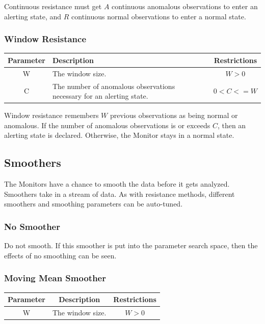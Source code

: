 \documentclass[12pt]{ucthesis}
\begin{document}
Continuous resistance must get $A$ continuous anomalous observations to enter an alerting state, and $R$ continuous normal
observations to enter a normal state.

\subsubsection{Window Resistance}
\begin{table}[H]
   \begin{center}
      \begin{tabular}{|c|p{9cm}|c|}
         \hline
            Parameter & Description & Restrictions \\
         \hline
            W & The window size. & $ W > 0 $ \\
         \hline
            C & The number of anomalous observations necessary for an alerting state. & $ 0 < C <= W $ \\
         \hline
      \end{tabular}
   \end{center}
\end{table}

Window resistance remembers $W$  previous observations as being normal or anomalous. If the number of anomalous
observations is or exceeds $C$, then an alerting state is declared. Otherwise, the Monitor stays in a normal state.

\subsection{Smoothers}
\label{arch-smoothers}
The Monitors have a chance to smooth the data before it gets analyzed.
Smoothers take in a stream of data.
As with resistance methods, different smoothers and smoothing parameters can be auto-tuned.

\subsubsection{No Smoother}
Do not smooth. If this smoother is put into the parameter search space, then the effects of no smoothing can be seen.

\subsubsection{Moving Mean Smoother}
\begin{table}[H]
   \begin{center}
      \begin{tabular}{|c|c|c|}
         \hline
            Parameter & Description & Restrictions \\
         \hline
            W & The window size. & $ W > 0 $ \\
         \hline
      \end{tabular}
   \end{center}
\end{table}
\end{document}
